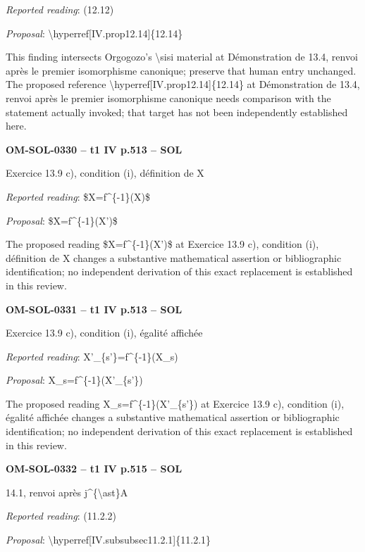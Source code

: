 \emph{Reported reading}: (12.12)\par
\emph{Proposal}: \textbackslash{}hyperref[IV.prop12.14]\{12.14\}\par
This finding intersects Orgogozo's \textbackslash{}sisi material at Démonstration de 13.4, renvoi après le premier isomorphisme canonique; preserve that human entry unchanged. The proposed reference \textbackslash{}hyperref[IV.prop12.14]\{12.14\} at Démonstration de 13.4, renvoi après le premier isomorphisme canonique needs comparison with the statement actually invoked; that target has not been independently established here.\par
\par\noindent\textbf{OM-SOL-0330 -- t1 IV p.513 -- SOL}\par
Exercice 13.9 c), condition (i), définition de X\par
\emph{Reported reading}: \$X=\allowbreak f\textasciicircum{}\{-1\}(X)\$\par
\emph{Proposal}: \$X=\allowbreak f\textasciicircum{}\{-1\}(X')\$\par
The proposed reading \$X=\allowbreak f\textasciicircum{}\{-1\}(X')\$ at Exercice 13.9 c), condition (i), définition de X changes a substantive mathematical assertion or bibliographic identification; no independent derivation of this exact replacement is established in this review.\par
\par\noindent\textbf{OM-SOL-0331 -- t1 IV p.513 -- SOL}\par
Exercice 13.9 c), condition (i), égalité affichée\par
\emph{Reported reading}: X'\_\{s'\}=\allowbreak f\textasciicircum{}\{-1\}(X\_s)\par
\emph{Proposal}: X\_s=\allowbreak f\textasciicircum{}\{-1\}(X'\_\{s'\})\par
The proposed reading X\_s=\allowbreak f\textasciicircum{}\{-1\}(X'\_\{s'\}) at Exercice 13.9 c), condition (i), égalité affichée changes a substantive mathematical assertion or bibliographic identification; no independent derivation of this exact replacement is established in this review.\par
\par\noindent\textbf{OM-SOL-0332 -- t1 IV p.515 -- SOL}\par
14.1, renvoi après j\textasciicircum{}\{\textbackslash{}ast\}A\par
\emph{Reported reading}: (11.2.2)\par
\emph{Proposal}: \textbackslash{}hyperref[IV.subsubsec11.2.1]\{11.2.1\}\par
